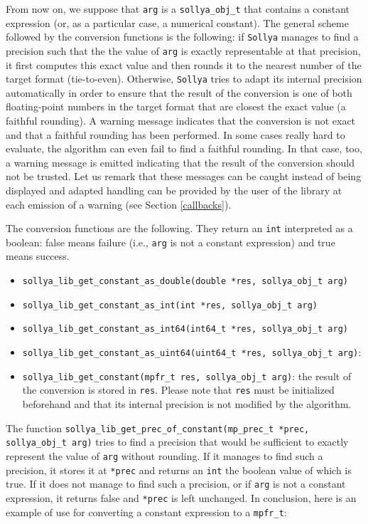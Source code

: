 \documentclass[a4paper]{article}
\newcommand{\sollya}{\texttt{Sollya}\xspace}
\begin{document}
From now on, we suppose that \verb|arg| is a \verb|sollya_obj_t| that contains a constant expression (or, as a particular case, a numerical constant). The general scheme followed by the conversion functions is the following: if \sollya manages to find a precision such that the the value of \verb|arg| is exactly representable at that precision, it first computes this exact value and then rounds it to the nearest number of the target format (tie-to-even). Otherwise, \sollya tries to adapt its internal precision automatically in order to ensure that the result of the conversion is one of both floating-point numbers in the target format that are closest the exact value (a faithful rounding). A warning message indicates that the conversion is not exact and that a faithful rounding has been performed. In some cases really hard to evaluate, the algorithm can even fail to find a faithful rounding. In that case, too, a warning message is emitted indicating that the result of the conversion should not be trusted. Let us remark that these messages can be caught instead of being displayed and adapted handling can be provided by the user of the library at each emission of a warning (see Section \ref{callbacks}).

The conversion functions are the following. They return an \verb|int| interpreted as a boolean: false means failure (i.e., \verb|arg| is not a constant expression) and true means success.
\begin{itemize}
\item \verb|sollya_lib_get_constant_as_double(double *res, sollya_obj_t arg)|
\item \verb|sollya_lib_get_constant_as_int(int *res, sollya_obj_t arg)|
\item \verb|sollya_lib_get_constant_as_int64(int64_t *res, sollya_obj_t arg)|
\item \verb|sollya_lib_get_constant_as_uint64(uint64_t *res, sollya_obj_t arg)|:
\item \verb|sollya_lib_get_constant(mpfr_t res, sollya_obj_t arg)|: the result of the conversion is stored in \verb|res|. Please note that \verb|res| must be initialized beforehand and that its internal precision is not modified by the algorithm.
\end{itemize}

The function  \verb|sollya_lib_get_prec_of_constant(mp_prec_t *prec, sollya_obj_t arg)| tries to find a precision that would be sufficient to exactly represent the value of \verb|arg| without rounding. If it manages to find such a precision, it stores it at \verb|*prec| and returns an \verb|int| the boolean value of which is true. If it does not manage to find such a precision, or if \verb|arg| is not a constant expression, it returns false and \verb|*prec| is left unchanged. In conclusion, here is an example of use for converting a constant expression to a \verb|mpfr_t|:
\end{document}
